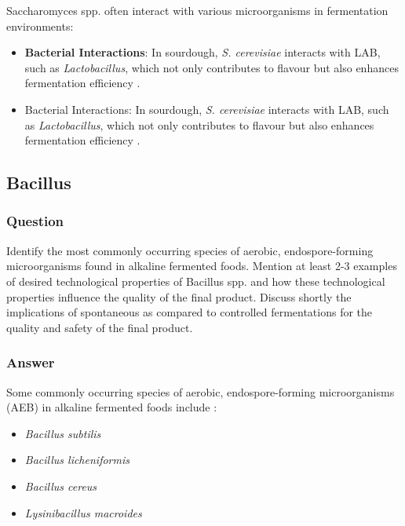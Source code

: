 Saccharomyces spp. often interact with various microorganisms in fermentation environments:
\begin{itemize}
    \item \textbf{Bacterial Interactions}: In sourdough, \textit{S. cerevisiae} interacts with LAB, such as \textit{Lactobacillus}, which not only contributes to flavour but also enhances fermentation efficiency \cite*{L9-Coryn}.
    \item Bacterial Interactions: In sourdough, \textit{S. cerevisiae} interacts with LAB, such as \textit{Lactobacillus}, which not only contributes to flavour but also enhances fermentation efficiency \cite*{LabManual}.
\end{itemize}

\subsection{Bacillus}
\subsubsection*{Question}
Identify the most commonly occurring species of aerobic, endospore-forming microorganisms found in alkaline fermented foods. Mention at least 2-3 examples of desired technological properties of Bacillus spp. and how these technological properties influence the quality of the final product. Discuss shortly the implications of spontaneous as compared to controlled fermentations for the quality and safety of the final product.  

\subsubsection*{Answer}
Some commonly occurring species of aerobic, endospore-forming microorganisms (AEB) in alkaline fermented foods include \cite*{L8-ImpQuorum}:
\begin{itemize}
    \item \textit{Bacillus subtilis}
    \item \textit{Bacillus licheniformis}
    \item \textit{Bacillus cereus}
    \item \textit{Lysinibacillus macroides}
\end{itemize}

